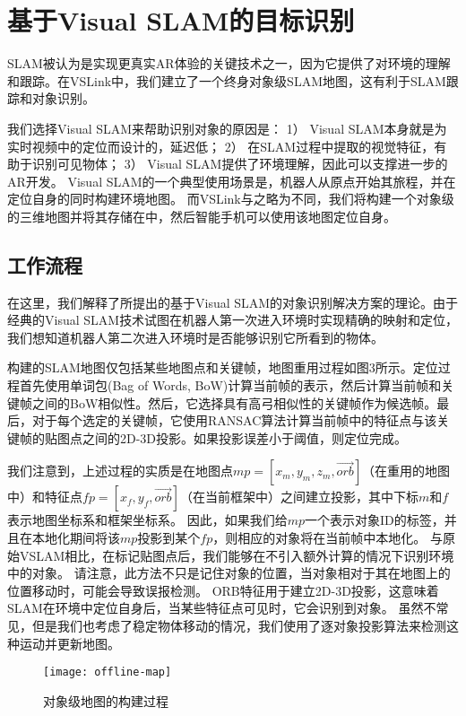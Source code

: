 \section{基于Visual SLAM的目标识别}\label{sec:vslam}
SLAM被认为是实现更真实AR体验的关键技术之一，因为它提供了对环境的理解和跟踪。在VSLink中，我们建立了一个终身对象级SLAM地图，这有利于SLAM跟踪和对象识别。

我们选择Visual SLAM来帮助识别对象的原因是：
1） Visual SLAM本身就是为实时视频中的定位而设计的，延迟低；
2） 在SLAM过程中提取的视觉特征，有助于识别可见物体；
3） Visual SLAM提供了环境理解，因此可以支撑进一步的AR开发。
Visual SLAM的一个典型使用场景是，机器人从原点开始其旅程，并在定位自身的同时构建环境地图。
而VSLink与之略为不同，我们将构建一个对象级的三维地图并将其存储在{\edg}中，然后智能手机可以使用该地图定位自身。

\subsection{工作流程}
在这里，我们解释了所提出的基于Visual SLAM的对象识别解决方案的理论。由于经典的Visual SLAM\cite{mur2017orb,engel2014lsd}技术试图在机器人第一次进入环境时实现精确的映射和定位，我们想知道机器人第二次进入环境时是否能够识别它所看到的物体。

构建的SLAM地图\cite{mur2017orb}仅包括某些地图点和关键帧，地图重用过程如图3所示。定位过程首先使用单词包(Bag of Words, BoW)\cite{galvez2012bags}计算当前帧的表示，然后计算当前帧和关键帧之间的BoW相似性。然后，它选择具有高弓相似性的关键帧作为候选帧。最后，对于每个选定的关键帧，它使用RANSAC\cite{derpanis2010overview}算法计算当前帧中的特征点与该关键帧的贴图点之间的2D-3D投影。如果投影误差小于阈值，则定位完成。

我们注意到，上述过程的实质是在地图点$mp = [x_m,y_m,z_m,\vec{orb}]$（在重用的地图中）和特征点$fp = [x_f,y_f,\vec{orb}]$（在当前框架中）之间建立投影，其中下标$m$和$f$表示地图坐标系和框架坐标系。
因此，如果我们给$mp$一个表示对象ID的标签，并且在本地化期间将该$mp$投影到某个$fp$，则相应的对象将在当前帧中本地化。
与原始VSLAM相比，在标记贴图点后，我们能够在不引入额外计算的情况下识别环境中的对象。
请注意，此方法不只是记住对象的位置，当对象相对于其在地图上的位置移动时，可能会导致误报检测。
ORB特征用于建立2D-3D投影，这意味着SLAM在环境中定位自身后，当某些特征点可见时，它会识别到对象。
虽然不常见，但是我们也考虑了稳定物体移动的情况，我们使用了逐对象投影算法来检测这种运动并更新地图。


\begin{figure}[t]
	\centering
	\texttt{[image: offline-map]}
	\caption{对象级地图的构建过程}
	\label{fig:offlinemap}
\end{figure}

